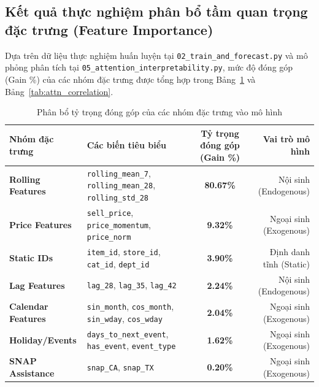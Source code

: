 \documentclass[12pt,a4paper,oneside]{article}
\begin{document}
\subsection{Kết quả thực nghiệm phân bổ tầm quan trọng đặc trưng (Feature Importance)}

Dựa trên dữ liệu thực nghiệm huấn luyện tại \texttt{02\_train\_and\_forecast.py} và mô phỏng phân tích tại \texttt{05\_attention\_interpretability.py}, mức độ đóng góp (Gain \%) của các nhóm đặc trưng được tổng hợp trong Bảng~\ref{tab:group_importance} và Bảng~\ref{tab:attn_correlation}.

\begin{table}[htbp]
\centering
\caption{Phân bổ tỷ trọng đóng góp của các nhóm đặc trưng vào mô hình}
\label{tab:group_importance}
\begin{tabular}{lp{6.5cm}cr}
\toprule
\textbf{Nhóm đặc trưng} & \textbf{Các biến tiêu biểu} & \textbf{Tỷ trọng đóng góp (Gain \%)} & \textbf{Vai trò mô hình} \\
\midrule
\textbf{Rolling Features} & \texttt{rolling\_mean\_7}, \texttt{rolling\_mean\_28}, \texttt{rolling\_std\_28} & \textbf{80.67\%} & Nội sinh (Endogenous) \\
\textbf{Price Features}   & \texttt{sell\_price}, \texttt{price\_momentum}, \texttt{price\_norm} & \textbf{9.32\%} & Ngoại sinh (Exogenous) \\
\textbf{Static IDs}       & \texttt{item\_id}, \texttt{store\_id}, \texttt{cat\_id}, \texttt{dept\_id} & \textbf{3.90\%} & Định danh tĩnh (Static) \\
\textbf{Lag Features}     & \texttt{lag\_28}, \texttt{lag\_35}, \texttt{lag\_42} & \textbf{2.24\%} & Nội sinh (Endogenous) \\
\textbf{Calendar Features}& \texttt{sin\_month}, \texttt{cos\_month}, \texttt{sin\_wday}, \texttt{cos\_wday} & \textbf{2.04\%} & Ngoại sinh (Exogenous) \\
\textbf{Holiday/Events}   & \texttt{days\_to\_next\_event}, \texttt{has\_event}, \texttt{event\_type} & \textbf{1.62\%} & Ngoại sinh (Exogenous) \\
\textbf{SNAP Assistance}  & \texttt{snap\_CA}, \texttt{snap\_TX} & \textbf{0.20\%} & Ngoại sinh (Exogenous) \\
\bottomrule
\end{tabular}
\end{table}
\end{document}
